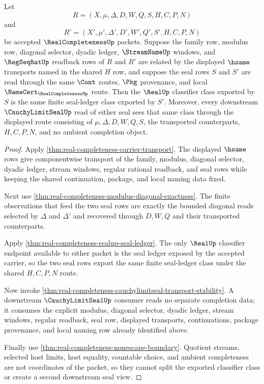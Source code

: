 \begin{theorem}
\label{thm:real-completeness-seal-classifier-stability}
Let
$$
R=(X,\mu,\Delta,D,W,Q,S,H,C,P,N)
$$
and
$$
R'=(X',\mu',\Delta',D',W',Q',S',H,C,P,N)
$$
be accepted $\RealCompletenessUp$ packets. Suppose the family row, modulus row, diagonal selector, dyadic ledger, $\StreamNameUp$ windows, and $\RegSeqRatUp$ readback rows of $R$ and $R'$ are related by the displayed $\hsame$ transports named in the shared $H$ row, and suppose the seal rows $S$ and $S'$ are read through the same $\Cont$ routes, $\Pkg$ provenance, and local $\NameCert_{\RealCompletenessUp}$ route. Then the $\RealUp$ classifier class exported by $S$ is the same finite seal-ledger class exported by $S'$. Moreover, every downstream $\CauchyLimitSealUp$ read of either seal sees that same class through the displayed route consisting of $\mu,\Delta,D,W,Q,S$, the transported counterparts, $H,C,P,N$, and no ambient completion object.
\end{theorem}
\begin{proof}
Apply \autoref{thm:real-completeness-carrier-transport}. The displayed $\hsame$ rows give componentwise transport of the family, modulus, diagonal selector, dyadic ledger, stream windows, regular rational readback, and seal rows while keeping the shared continuation, package, and local naming data fixed.

Next use \autoref{thm:real-completeness-modulus-diagonal-exactness}. The finite observations that feed the two seal rows are exactly the bounded diagonal reads selected by $\Delta$ and $\Delta'$ and recovered through $D,W,Q$ and their transported counterparts.

Apply \autoref{thm:real-completeness-realup-seal-ledger}. The only $\RealUp$ classifier endpoint available to either packet is the seal ledger exposed by the accepted carrier, so the two seal rows export the same finite seal-ledger class under the shared $H,C,P,N$ route.

Now invoke \autoref{thm:real-completeness-cauchylimitseal-transport-stability}. A downstream $\CauchyLimitSealUp$ consumer reads no separate completion data; it consumes the explicit modulus, diagonal selector, dyadic ledger, stream windows, regular readback, seal row, displayed transports, continuations, package provenance, and local naming row already identified above.

Finally use \autoref{thm:real-completeness-nonescape-boundary}. Quotient streams, selected host limits, host equality, countable choice, and ambient completeness are not coordinates of the packet, so they cannot split the exported classifier class or create a second downstream seal view.
\end{proof}

